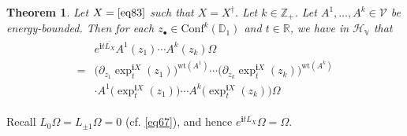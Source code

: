 \documentclass[12pt,b5paper,notitlepage]{article}
\theoremstyle{definition}
\theoremstyle{plain}
\newtheorem{thm}[df]{Theorem}
\newcommand{\mc}{\mathcal}
\newcommand{\ovl}{\overline}
\newcommand{\Conf}{\mathrm{Conf}}
\newcommand{\im}{\mathbf{i}}
\newcommand{\blt}{\bullet}
\newcommand{\Zbb}{\mathbb Z}
\newcommand{\Rbb}{\mathbb R}
\newcommand{\Dbb}{\mathbb D}
\newcommand{\wt}{\mathrm{wt}}
\newcommand{\HV}{\mathcal H_{\mathbb V}}
\numberwithin{equation}{section}
\begin{document}
\begin{thm}\label{lb80}
Let $X=\eqref{eq83}$ such that $X=X^\dagger$. Let $k\in\Zbb_+$. Let $A^1,\dots,A^k\in\mc V$ be energy-bounded. Then for each  $z_\blt\in\Conf^k(\Dbb_1)$ and $t\in\Rbb$, we have in $\HV$ that
\begin{align}\label{eq94}
\begin{aligned}
&e^{\im t\ovl{L_X}}A^1(z_1)\cdots A^k(z_k)\Omega\\
=&\big(\partial_{z_1}\exp^{\im X}_t(z_1)\big)^{\wt(A^1)}\cdots \big(\partial_{z_k}\exp^{\im X}_t(z_k)\big)^{\wt(A^k)}\\
&\cdot A^1\big(\exp^{\im X}_t(z_1)\big)\cdots A^k\big(\exp^{\im X}_t(z_k)\big)\Omega
\end{aligned}
\end{align}
\end{thm}


Recall $L_0\Omega=L_{\pm 1}\Omega=0$ (cf. \eqref{eq67}), and hence $e^{\im t\ovl{L_X}}\Omega=\Omega$.
\end{document}
